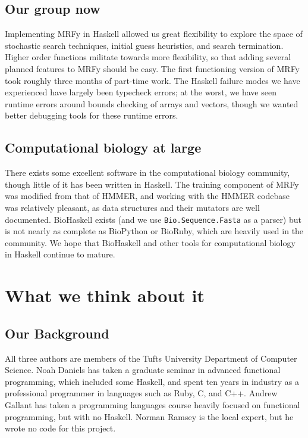 \documentclass[preprint,nonatbib,blockstyle,nocopyrightspace,times]{sigplanconf}
\begin{document}
\subsection{Our group now}
Implementing MRFy in Haskell allowed us great flexibility to explore the space of stochastic search
techniques, initial guess heuristics, and search termination.
Higher order functions militate towards more flexibility, so that adding several planned features 
to MRFy should be easy.
The first functioning version of MRFy took roughly three months of part-time work.
The Haskell failure modes we have experienced have largely been typecheck errors; at the worst,
we have seen runtime errors around bounds checking of arrays and vectors, though we wanted
better debugging tools for these runtime errors.

\subsection{Computational biology at large}
There exists some excellent software in the computational biology community, though little of it
has been written in Haskell.
The training component of MRFy was modified from that of HMMER, and working with the HMMER
codebase was relatively pleasant, as data structures and their mutators are well documented.
BioHaskell exists (and we use \texttt{Bio.Sequence.Fasta} as a parser) but is not nearly as
complete as BioPython or BioRuby, which are heavily used in the community.
We hope that BioHaskell and other tools for computational biology in Haskell continue to mature.
\section{What we think about it}

\subsection{Our Background}

All three authors are members of the Tufts University Department of Computer
Science.
Noah Daniels has taken a graduate seminar in advanced functional
programming, which included some Haskell, and spent ten years in industry as a
professional programmer in languages such as Ruby, C, and C++.
Andrew Gallant has taken a programming languages course heavily focused on 
functional programming, but with no Haskell.
Norman Ramsey is the local expert, but he wrote no code for this project.
\end{document}
